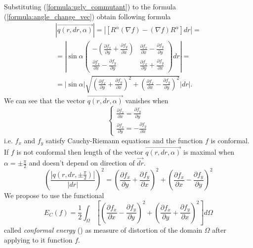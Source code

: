 \documentclass{article}
\newcommand{\vect}{\overrightarrow}
\begin{document}
Substituting (\ref{formula:ugly_commutant}) to the formula (\ref{formula:angle_change_vec}) obtain following formula
\begin{multline*} 
  \left| \vect{q(r, dr, \alpha)} \right| = \left| \left[R^\alpha (\nabla f) - (\nabla f) R^\alpha \right] dr \right| = \\
  = \left| \sin \alpha \begin{pmatrix}
    -(\frac{\partial f_x}{\partial y} + \frac{\partial f_y}{\partial x}) &
    \frac{\partial f_x}{\partial x} - \frac{\partial f_y}{\partial y} \\
    \frac{\partial f_x}{\partial x} - \frac{\partial f_y}{\partial y} &
    \frac{\partial f_x}{\partial y} + \frac{\partial f_y}{\partial x} 
  \end{pmatrix} dr \right| = \\
  = |\sin \alpha| \sqrt{\left(\frac{\partial f_x}{\partial y} + \frac{\partial f_y}{\partial x}\right)^2 + \left(\frac{\partial f_x}{\partial x} - \frac{\partial f_y}{\partial y}\right)^2} \left| dr \right|.
\end{multline*}
We can see that the vector $\vect{q(r, dr, \alpha)}$ vanishes when 
$$\begin{cases}
  \frac{\partial f_x}{\partial x} = \frac{\partial f_y}{\partial y} \\
  \frac{\partial f_x}{\partial y} = -\frac{\partial f_y}{\partial x} 
\end{cases}$$
i.e. $f_x$ and $f_y$ satisfy Cauchy-Riemann equations and the function $f$ is conformal. If $f$ is not conformal then length of the vector $\vect{q(r, dr, \alpha)}$ is maximal when $\alpha = \pm \frac{\pi}{2}$ 
and doesn't depend on direction of $\vect{dr}$. 
\begin{equation*}
  \left(\frac{\left| {q(r, dr, \pm \frac{\pi}{2})} \right|}{|dr|}\right)^2 = 
  \left(\frac{\partial f_x}{\partial y} + \frac{\partial f_y}{\partial x}\right)^2 + \left(\frac{\partial f_x}{\partial x} - \frac{\partial f_y}{\partial y}\right)^2 
\end{equation*}
We propose to use the functional 
\begin{equation*}
  E_C(f) = \frac{1}{2} \int_{\Omega}\left[{\left(\frac{\partial f_x}{\partial x} - \frac{\partial f_y}{\partial y}\right)^2 + \left(\frac{\partial f_x}{\partial y} + \frac{\partial f_y}{\partial x}\right)^2}\right] d\Omega   
\end{equation*}
called \textit{conformal energy} (\cite{Polthier}) as measure of distortion of the domain $\Omega$ after applying to it function $f$.
\end{document}
